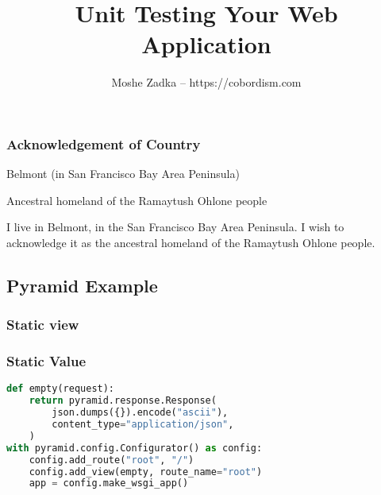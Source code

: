 \usepackage{hyperref}
\usepackage{graphicx}
\usepackage{listings}
\usepackage{textcomp}
\usepackage{fancyvrb}

\newcommand{\passthrough}[1]{\lstset{mathescape=false}#1\lstset{mathescape=true}}
\newcommand{\tightlist}{}

\title{Unit Testing Your Web Application}
\author{Moshe Zadka -- https://cobordism.com}
\date{}


\begin{titlepage}
\maketitle
\end{titlepage}

\frame{\titlepage}

\begin{frame}
\frametitle{Acknowledgement of Country}

Belmont (in San Francisco Bay Area Peninsula)

Ancestral homeland of the Ramaytush Ohlone people

\end{frame}

I live in Belmont, in the San Francisco Bay Area Peninsula. I wish to
acknowledge it as the ancestral homeland of the Ramaytush Ohlone people.

\hypertarget{pyramid-example}{%
\subsection{Pyramid Example}\label{pyramid-example}}

\hypertarget{static-view}{%
\subsubsection{Static view}\label{static-view}}

\begin{frame}[fragile]
\frametitle{Static Value}

\begin{lstlisting}[language=Python]
def empty(request):
    return pyramid.response.Response(
        json.dumps({}).encode("ascii"),
        content_type="application/json",
    )
with pyramid.config.Configurator() as config:
    config.add_route("root", "/")
    config.add_view(empty, route_name="root")
    app = config.make_wsgi_app()
\end{lstlisting}

\end{frame}

